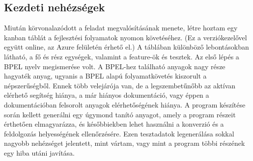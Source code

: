 \subsection{Kezdeti nehézségek}
Miután körvonalazódott a feladat megvalósításának menete, létre hoztam egy kanban táblát a fejlesztési folyamatok nyomon követéséhez. (Ez a verziókezelővel együtt online, az Azure felületén érhető el.) A táblában különböző lebontásokban látható, a fő és rész egységek, valamint a feature-ök és tesztek. Az első lépés a BPEL nyelv megismerése volt. A BPEL-hez található anyagok nagy része hagyaték anyag, ugyanis a BPEL alapú folyamatkövetés kiszorult a népszerűségből. Ennek több velejárója van, de a legszembetűnőbb az aktívan elérhető segítség hiánya, a már hiányos dokumentáció, vagy éppen a dokumentációban felsorolt anyagok elérhetőségének hiánya. A program készítése során kellett generálni egy úgymond tanító anyagot, amely a program részeit érthetően elmagyarázza, és későbbiekben lehet használni a konverzió és a feldolgozás helyességének ellenőrzésére. Ezen tesztadatok legenerálása sokkal nagyobb nehézséget jelentett, mint vártam, vagy mint a program többi részének egy hiba utáni javítása. \\
